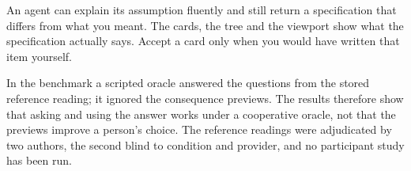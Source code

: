 \begin{warnbox}
An agent can explain its assumption fluently and still return a specification that differs from what you meant. The
cards, the tree and the viewport show what the specification actually says. Accept a card only when you would have
written that item yourself.
\end{warnbox}

\begin{notebox}
In the benchmark a scripted oracle answered the questions from the stored reference reading; it ignored the
consequence previews. The results therefore show that asking and using the answer works under a cooperative oracle,
not that the previews improve a person's choice. The reference readings were adjudicated by two authors, the second blind to condition and provider, and no
participant study has been run.
\end{notebox}
